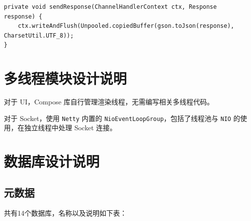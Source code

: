 \documentclass{article}
\begin{document}
\begin{lstlisting}
private void sendResponse(ChannelHandlerContext ctx, Response response) {
    ctx.writeAndFlush(Unpooled.copiedBuffer(gson.toJson(response), CharsetUtil.UTF_8));
}
\end{lstlisting}

\section{多线程模块设计说明}

对于 UI，Compose 库自行管理渲染线程，无需编写相关多线程代码。

对于 Socket，使用 \texttt{Netty} 内置的 \texttt{NioEventLoopGroup}，包括了线程池与 \texttt{NIO} 的使用，在独立线程中处理 Socket 连接。

\section{数据库设计说明}
\subsection{元数据}

共有14个数据库，名称以及说明如下表：

\begin{table}[H]
  \centering
\end{table}
\end{document}
